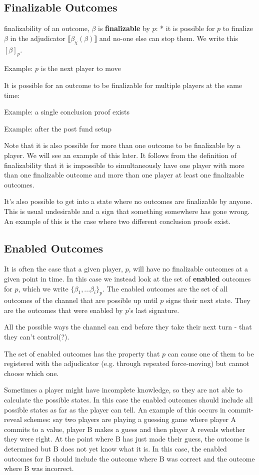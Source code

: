 \documentclass{article}
\theoremstyle{definition}
\newcommand{\adj}[1]{\llbracket #1 \rrbracket}
\newcommand{\enf}[1]{[#1]}
\begin{document}
\subsection{Finalizable Outcomes}

finalizability of an outcome, $\beta$ is \textbf{finalizable} by $p$:
* it is possible for $p$ to finalize $\beta$ in the adjudicator $\adj{\beta_\chi(\beta)}$ and no-one else can stop them. We write this $\enf{\beta}_p$.

Example: $p$ is the next player to move

It is possible for an outcome to be finalizable for multiple players at the same time:

Example: a single conclusion proof exists

Example: after the post fund setup

Note that it is also possible for more than one outcome to be finalizable by a player. We will see an example of this later. It follows from the definition of finalizability that it is impossible to simultaneously have one player with more than one finalizable outcome and more than one player at least one finalizable outcomes. 

It's also possible to get into a state where no outcomes are finalizable by anyone. This is usual undesirable and a sign that something somewhere has gone wrong. An example of this is the case where two different conclusion proofs exist.


\subsection{Enabled Outcomes}

It is often the case that a given player, $p$, will have no finalizable outcomes at a given point in time. In this case we instead look at the set of \textbf{enabled} outcomes for $p$, which we write $\{\beta_1, ... \beta_i\}_p$. The enabled outcomes are the set of all outcomes of the channel that are possible up until $p$ signs their next state. They are the outcomes that were enabled by $p$'s last signature.

All the possible ways the channel can end before they take their next turn - that they can't control(?).

The set of enabled outcomes has the property that $p$ can cause one of them to be registered with the adjudicator (e.g. through repeated force-moving) but cannot choose which one.

Sometimes a player might have incomplete knowledge, so they are not able to calculate the possible states. In this case the enabled outcomes should include all possible states as far as the player can tell. An example of this occurs in commit-reveal schemes: say two players are playing a guessing game where player A commits to a value, player B makes a guess and then player A reveals whether they were right. At the point where B has just made their guess, the outcome is determined but B does not yet know what it is. In this case, the enabled outcomes for B should include the outcome where B was correct and the outcome where B was incorrect.
\end{document}
